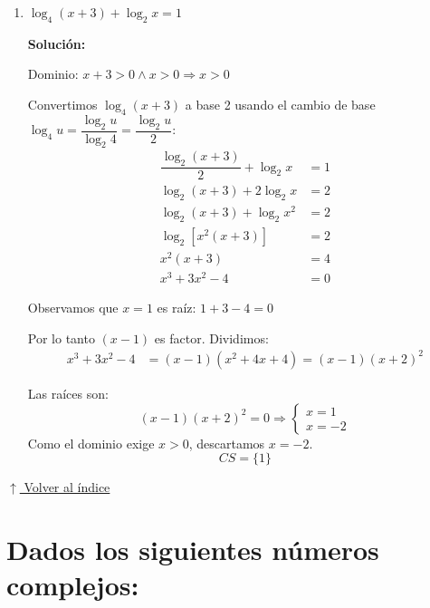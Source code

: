 \documentclass[12pt]{article}
\newcommand{\solucion}{%
    \vspace{0.8em}%
    \textbf{Solución:}%
}
\newcommand{\volverindice}{%
    \vspace{1em}%
    \begin{flushright}%
        \hyperlink{indice}{\small $\uparrow$ Volver al índice}%
    \end{flushright}%
}
\begin{document}
\begin{enumerate}[label=\alph*.-]
    \[
    x - 5 = \pm 1 \Rightarrow \begin{cases} x_1 = 6 \\ x_2 = 4 \end{cases}
    \]

    Ambos cumplen $x > 1$.
    \[
    \boxed{CS = \{4,\ 6\}}
    \]

    \newpage
    \item $\log_4(x+3) + \log_2 x = 1$

    \solucion

    Dominio: $x + 3 > 0 \land x > 0 \Rightarrow x > 0$

    Convertimos $\log_4(x+3)$ a base 2 usando el cambio de base $\log_4 u = \dfrac{\log_2 u}{\log_2 4} = \dfrac{\log_2 u}{2}$:
    \begin{align*}
    \dfrac{\log_2(x+3)}{2} + \log_2 x &= 1 \\[0.3em]
    \log_2(x+3) + 2\log_2 x &= 2 \\[0.3em]
    \log_2(x+3) + \log_2 x^2 &= 2 \\[0.3em]
    \log_2\left[x^2(x+3)\right] &= 2 \\[0.3em]
    x^2(x+3) &= 4 \\[0.3em]
    x^3 + 3x^2 - 4 &= 0
    \end{align*}

    Observamos que $x = 1$ es raíz: $1 + 3 - 4 = 0$ \checkmark

    Por lo tanto $(x-1)$ es factor. Dividimos:
    \begin{align*}
    x^3 + 3x^2 - 4 &= (x-1)(x^2 + 4x + 4) = (x-1)(x+2)^2
    \end{align*}

    Las raíces son:
    \[
    (x-1)(x+2)^2 = 0 \Rightarrow \begin{cases} x = 1 \\ x = -2 \end{cases}
    \]
    Como el dominio exige $x > 0$, descartamos $x = -2$.
    \[
    \boxed{CS = \{1\}}
    \]

\end{enumerate}

\volverindice
\newpage

\section[Números complejos]{Dados los siguientes números complejos:}
\end{document}
